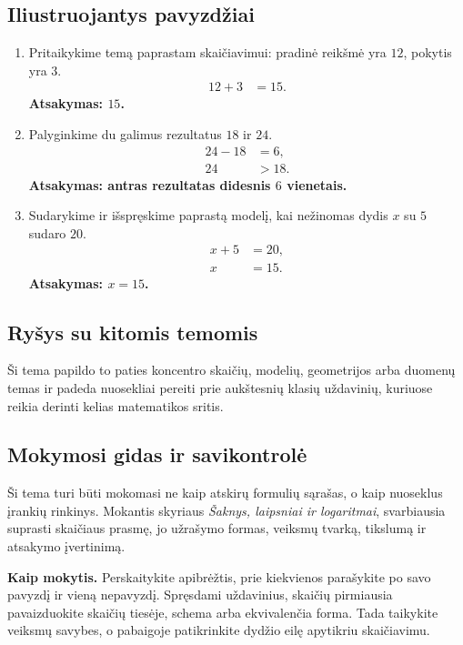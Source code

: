 \subsection{Iliustruojantys pavyzdžiai}
\begin{enumerate}[label=\arabic*.]
\item Pritaikykime temą paprastam skaičiavimui: pradinė reikšmė yra \(12\), pokytis yra \(3\).
\begin{align}
12+3&=15.
\end{align}
\textbf{Atsakymas: \(15\).}
\item Palyginkime du galimus rezultatus \(18\) ir \(24\).
\begin{align}
24-18&=6,\\
24&>18.
\end{align}
\textbf{Atsakymas: antras rezultatas didesnis \(6\) vienetais.}
\item Sudarykime ir išspręskime paprastą modelį, kai nežinomas dydis \(x\) su \(5\) sudaro \(20\).
\begin{align}
x+5&=20,\\
x&=15.
\end{align}
\textbf{Atsakymas: \(x=15\).}
\end{enumerate}

\subsection{Ryšys su kitomis temomis}
Ši tema papildo to paties koncentro skaičių, modelių, geometrijos arba duomenų temas ir padeda nuosekliai pereiti prie aukštesnių klasių uždavinių, kuriuose reikia derinti kelias matematikos sritis.

\subsection{Mokymosi gidas ir savikontrolė}

Ši tema turi būti mokomasi ne kaip atskirų formulių sąrašas, o kaip nuoseklus įrankių rinkinys. Mokantis skyriaus \textit{Šaknys, laipsniai ir logaritmai}, svarbiausia suprasti skaičiaus prasmę, jo užrašymo formas, veiksmų tvarką, tikslumą ir atsakymo įvertinimą.

\textbf{Kaip mokytis.} Perskaitykite apibrėžtis, prie kiekvienos parašykite po savo pavyzdį ir vieną nepavyzdį. Spręsdami uždavinius, skaičių pirmiausia pavaizduokite skaičių tiesėje, schema arba ekvivalenčia forma. Tada taikykite veiksmų savybes, o pabaigoje patikrinkite dydžio eilę apytikriu skaičiavimu.

